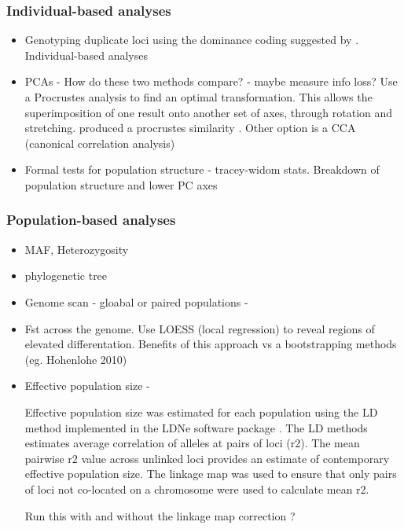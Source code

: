 \documentclass[12pt,  one column]{article}
\begin{document}
\subsubsection*{Individual-based analyses} 
\begin{itemize}[nosep]
	\item Genotyping duplicate loci using the dominance coding suggested by \cite{Patterson2006}. 
Individual-based analyses
	\item PCAs - How do these two methods compare? - maybe measure info loss?
    Use a Procrustes analysis to find an optimal transformation.  This allows the superimposition of one result onto another set of axes, through rotation and stretching.  produced a procrustes similarity \cite{Peres2001}.  Other option is a CCA (canonical correlation analysis)  
    \item Formal tests for population structure - tracey-widom stats.  Breakdown of population structure and lower PC axes

\end{itemize}

\subsubsection*{Population-based analyses} 

\begin{itemize}[nosep]
	\item MAF, Heterozygosity
    \item phylogenetic tree
    \item Genome scan - gloabal or paired populations - 	
    \item Fst across the genome.  Use LOESS (local regression) to reveal regions of elevated differentation.  Benefits of this approach vs a bootstrapping methods (eg. Hohenlohe 2010)
    \item Effective population size - 

    	Effective population size was estimated for each population using the LD method implemented in the LDNe software package \cite{Waples2010}.  The LD methods estimates average correlation of alleles at pairs of loci (r2). The mean pairwise r2 value across unlinked loci provides an estimate of contemporary effective population size. The linkage map was used to ensure that only pairs of loci not co-located on a chromosome were used to calculate mean r2.
        
Run this with and without the linkage map correction \cite{Larson2014}?

\end{itemize}
\end{document}
